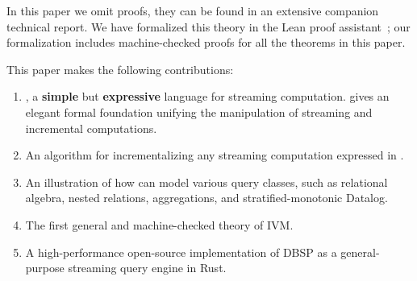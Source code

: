 In this paper we omit proofs, they can be found in an extensive
companion technical report.  We have formalized
this theory in the Lean proof
assistant~; our formalization includes
machine-checked proofs for all the theorems in this
paper.

This paper makes the following contributions:
\begin{enumerate}[nosep, leftmargin=0pt, itemindent=0.5cm, label=\textbf{(\arabic{*})}]
  \item \dbsp, a \textbf{simple} but \textbf{expressive} language for streaming
  computation. \dbsp gives an elegant formal foundation unifying the manipulation of
  streaming and incremental computations.
  \item An algorithm for incrementalizing any streaming computation expressed in
  \dbsp.
  \item An illustration of how \dbsp can model various query classes, such as relational algebra,
  nested relations, aggregations, and stratified-monotonic Datalog.
  \item The first general and machine-checked theory of IVM.
  \item A high-performance open-source implementation of DBSP as a
  general-purpose streaming query engine in Rust.
\end{enumerate}
